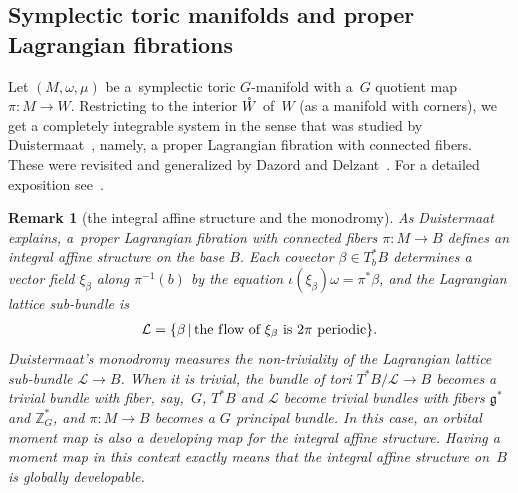 \documentclass[10pt,a4paper]{amsart}
\numberwithin{equation}{section}
\newtheorem{Remark}[Lemma]{Remark}
\begin{document}
\subsection*{Symplectic toric manifolds and proper Lagrangian f\/ibrations}

Let $(M,\omega,\mu)$ be a~symplectic toric $G$-manifold
with a~$G$ quotient map $\pi \colon M \to W$.
Restricting to the interior ${\mathaccent23{W}}$ of~$W$ (as a manifold with corners),
we get a completely integrable system in the sense that was studied
by Duistermaat~\cite{Duis}, namely, a proper Lagrangian f\/ibration
with connected f\/ibers.
These were revisited and generalized by Dazord and Delzant~\cite{DD}.
For a detailed exposition see~\cite{LTB}.

\begin{Remark}[the integral af\/f\/ine structure and the monodromy]
As Duistermaat explains, a~proper Lagrangian f\/ibration
with connected f\/ibers $\pi \colon M \to B$
def\/ines an integral af\/f\/ine structure on the base $B$.  Each covector
$\beta \in T_b^*B$ determines a vector f\/ield $\xi_\beta$ along $\pi^{-1}(b)$
by the equation $\iota(\xi_\beta)\omega = \pi^* \beta$,
and the Lagrangian lattice sub-bundle is
\begin{gather*}
 {\mathcal L} =
   \{ \beta \, | \, \text{the f\/low of $\xi_\beta$ is $2\pi$ periodic} \}.
   \end{gather*}
Duistermaat's monodromy measures the non-triviality of the Lagrangian
lattice sub-bundle \mbox{${\mathcal L} \to B$}.
When it is trivial, the bundle of tori $T^*B/{\mathcal L} \to B$
becomes a trivial bundle with f\/iber, say,~$G$,
 $T^*B$ and ${\mathcal L}$ become trivial bundles
with f\/ibers ${\mathfrak g}^*$ and ${\mathbb Z}_G^*$,
and $\pi \colon M \to B$ becomes a $G$ principal bundle.
In this case, an orbital moment map is also
a developing map for the integral af\/f\/ine structure.  Having a moment map
in this context exactly means that the integral af\/f\/ine structure on~$B$
is globally developable.
\end{Remark}
\end{document}

